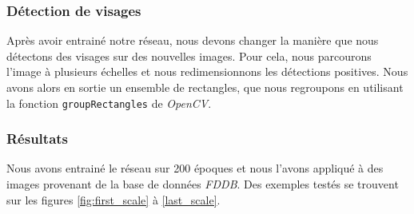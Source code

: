 \documentclass[a4paper,11pt]{article}
\begin{document}
\subsubsection{Détection de visages}
    
    Après avoir entrainé notre réseau, nous devons changer la manière que nous détectons des visages sur des nouvelles images.
    Pour cela, nous parcourons l'image à plusieurs échelles et nous redimensionnons les détections positives.
    Nous avons alors en sortie un ensemble de rectangles, que nous regroupons en utilisant la fonction \verb$groupRectangles$ de \textit{OpenCV}.

\subsubsection{Résultats}

    Nous avons entrainé le réseau sur 200 époques et nous l'avons appliqué à des images provenant de la base de données \textit{FDDB}.
    Des exemples testés se trouvent sur les figures \ref{fig:first_scale} à \ref{last_scale}.
\end{document}

